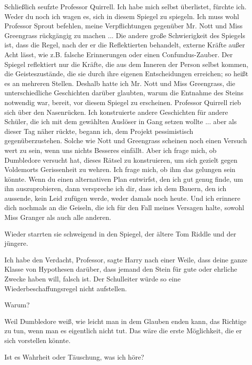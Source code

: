 Schließlich seufzte Professor Quirrell. \glqq{}Ich habe mich selbst überlistet,
fürchte ich. Weder du noch ich wagen es, sich in diesem Spiegel zu spiegeln. Ich
muss wohl Professor Sprout befehlen, meine Verpflichtungen gegenüber Mr. Nott
und Miss Greengrass rückgängig zu machen ... Die andere große Schwierigkeit des
Spiegels ist, dass die Regel, nach der er die Reflektierten behandelt, externe
Kräfte außer Acht lässt, wie z.B. falsche Erinnerungen oder einen
Confundus-Zauber. Der Spiegel reflektiert nur die Kräfte, die aus dem Inneren
der Person selbst kommen, die Geisteszustände, die sie durch ihre eigenen
Entscheidungen erreichen; so heißt es an mehreren Stellen. Deshalb hatte ich Mr.
Nott und Miss Greengrass, die unterschiedliche Geschichten darüber glaubten,
warum die Entnahme des Steins notwendig war, bereit, vor diesem Spiegel zu
erscheinen.\grqq{} Professor Quirrell rieb sich über den Nasenrücken. \glqq{}Ich
konstruierte andere Geschichten für andere Schüler, die ich mit dem gewählten
Auslöser in Gang setzen wollte ... aber als dieser Tag näher rückte, begann ich,
dem Projekt pessimistisch gegenüberzustehen. Solche wie Nott und Greengrass
scheinen noch einen Versuch wert zu sein, wenn uns nichts Besseres einfällt.
Aber ich frage mich, ob Dumbledore versucht hat, dieses Rätsel zu konstruieren,
um sich gezielt gegen Voldemorts Gerissenheit zu wehren. Ich frage mich, ob ihm
das gelungen sein könnte. Wenn du einen alternativen Plan entwirfst, den ich gut
genug finde, um ihn auszuprobieren, dann verspreche ich dir, dass ich dem
Bauern, den ich aussende, kein Leid zufügen werde, weder damals noch heute. Und
ich erinnere dich nochmals an die Geiseln, die ich für den Fall meines Versagen
halte, sowohl Miss Granger als auch alle anderen.\grqq{}

Wieder starrten sie schweigend in den Spiegel, der ältere Tom Riddle und der
jüngere.

\glqq{}Ich habe den Verdacht, Professor\grqq{}, sagte Harry nach einer Weile,
\glqq{}dass deine ganze Klasse von Hypothesen darüber, dass jemand den Stein für
gute oder ehrliche Zwecke haben will, falsch ist. Der Schulleiter würde so eine
Wiederbeschaffungsregel nicht aufstellen.\grqq{}

\glqq{}Warum?\grqq{}

\glqq{}Weil Dumbledore weiß, wie leicht man in dem Glauben enden kann, das
Richtige zu tun, wenn man es eigentlich nicht tut. Das wäre die erste
Möglichkeit, die er sich vorstellen könnte.\grqq{}

\glqq{}Ist es Wahrheit oder Täuschung, was ich höre?\grqq{}

